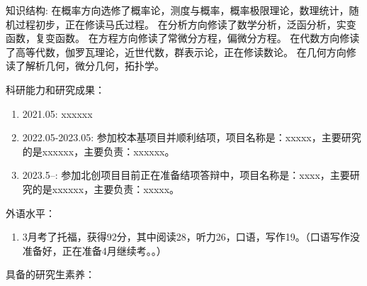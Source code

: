 \documentclass{ctexart}
\newif\ifpreface
\begin{document}
\large
\setlength{\baselineskip}{1.2em}
\ifpreface
  
  \newgeometry{left=2cm,right=2cm,top=2cm,bottom=2cm}
\else
  \maketitle
\fi

知识结构: 在概率方向选修了概率论，测度与概率，概率极限理论，数理统计，随机过程初步，正在修读马氏过程。
在分析方向修读了数学分析，泛函分析，实变函数，复变函数。
在方程方向修读了常微分方程，偏微分方程。
在代数方向修读了高等代数，伽罗瓦理论，近世代数，群表示论，正在修读数论。
在几何方向修读了解析几何，微分几何，拓扑学。

科研能力和研究成果：
\begin{enumerate}
  \item 2021.05: xxxxxx
  \item 2022.05-2023.05: 参加校本基项目并顺利结项，项目名称是：xxxxx，主要研究的是xxxxxx，主要负责：xxxxxx。
  \item 2023.5--: 参加北创项目目前正在准备结项答辩中，项目名称是：xxxx，主要研究的是xxxxxx，主要负责：xxxxx。
\end{enumerate}

外语水平：
\begin{enumerate}
  \item 3月考了托福，获得92分，其中阅读28，听力26，口语，写作19。（口语写作没准备好，正在准备4月继续考。。）
\end{enumerate}

具备的研究生素养：
\end{document}

